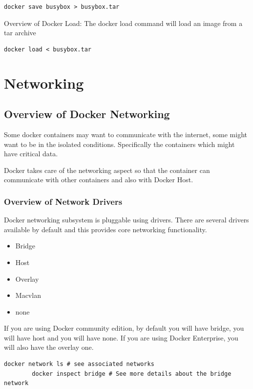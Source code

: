 \documentclass[11pt]{book}
\begin{document}
    \begin{lstlisting}[style=terminal]
        docker save busybox > busybox.tar
    \end{lstlisting}

    Overview of Docker Load:
    The docker load command will load an image from a tar archive

    \begin{lstlisting}[style=terminal]
        docker load < busybox.tar
    \end{lstlisting}


    \chapter{Networking}

    \section{Overview of Docker Networking}
    Some docker containers may want to communicate with the internet, some might want to be in the isolated conditions.
    Specifically the containers which might have critical data.

    Docker takes care of the networking aspect so that the container can communicate with other containers and also with Docker Host.

    \subsection{Overview of Network Drivers}
    Docker networking subsystem is pluggable using drivers.
    There are several drivers available by default and this provides core networking functionality.
    \begin{itemize}
        \item Bridge
        \item Host
        \item Overlay
        \item Macvlan
        \item none
    \end{itemize}

    If you are using Docker community edition, by default you will have bridge, you will have host and you will have none.
    If you are using Docker Enterprise, you will also have the overlay one.

    \begin{lstlisting}[style=terminal]
        docker network ls # see associated networks
        docker inspect bridge # See more details about the bridge network
    \end{lstlisting}
\end{document}
